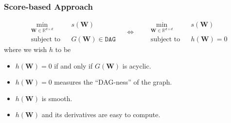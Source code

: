 \documentclass[10pt,xcolor={usenames,dvipsnames,table}]{beamer}
\begin{document}
\begin{frame}
    \frametitle{Score-based Approach}
    \begin{equation*}
    \begin{aligned}
        &\min_{\bm{W} \in \mathbb{R}^{d \times d}}  & & s(\bm{W}) \\
        &\text{subject to} && G(\bm{W}) \in \texttt{DAG}
    \end{aligned}
    \quad 
    \Leftrightarrow
    \quad 
    \begin{aligned}
        &\min_{\bm{W} \in \mathbb{R}^{d \times d}}  & & s(\bm{W}) \\
        &\text{subject to} && h(\bm{W}) = 0
    \end{aligned}
    \end{equation*}
    where we wish $h$ to be
    \begin{itemize}
        \item $h(\bm{W}) = 0$ if and only if $G(\bm{W})$ is acyclic.
        \item $h(\bm{W}) = 0$ measures the ``DAG-ness'' of the graph.
        \item $h(\bm{W})$ is smooth.
        \item $h(\bm{W})$ and its derivatives are easy to compute.
    \end{itemize}
\end{frame}
\end{document}
